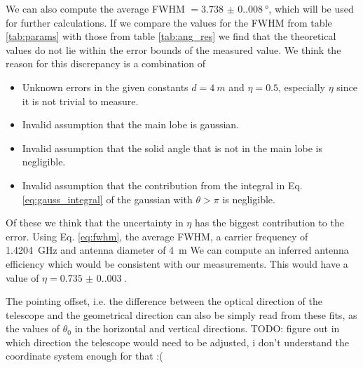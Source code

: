 We can also compute the average FWHM $= \SI{3.738(0.008)}{\degree}$, which will be used for further calculations.
If we compare the values for the FWHM from table \ref{tab:params} with those from table \ref{tab:ang_res}
we find that the theoretical values do not lie within the error bounds of the measured value.
We think the reason for this discrepancy is a combination of

\begin{itemize}
    \item Unknown errors in the given constants $d = \SI{4}{m}$ and $\eta = 0.5$, especially $\eta$ since it is not trivial to measure.
    \item Invalid assumption that the main lobe is gaussian.
    \item Invalid assumption that the solid angle that is not in the main lobe is negligible.
    \item Invalid assumption that the contribution from the integral in Eq. \eqref{eq:gauss_integral} of the gaussian with $\theta > \pi$ is negligible.
\end{itemize}

Of these we think that the uncertainty in $\eta$ has the biggest contribution to the error. Using Eq. \eqref{eq:fwhm}, the average FWHM, a carrier frequency of \SI{1.4204}{\giga \hertz} and antenna diameter of \SI{4}{m}
We can compute an inferred antenna efficiency which would be consistent with our measurements. This would have a value of $\eta = \SI{0.735(0.003)}{}$.

The pointing offset, i.e. the difference between the optical direction of the telescope and the geometrical direction can also be simply read from these fits, as the values of $\theta_0$ in the horizontal and vertical directions.
TODO: figure out in which direction the telescope would need to be adjusted, i don't understand the coordinate system enough for that :(